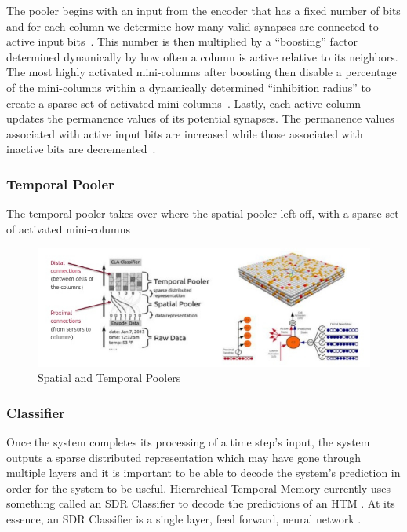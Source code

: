 \documentclass[oneside,12pt,openany]{book}
\begin{document}
	
	The pooler begins with an input from the encoder that has a fixed number of bits and for each column we determine how many valid synapses are connected to active input bits~\cite{Whitepaper}. This number is then multiplied by a ``boosting'' factor determined dynamically by how often a column is active relative to its neighbors. The most highly activated mini-columns after boosting then disable a percentage of the mini-columns within a dynamically determined ``inhibition radius'' to create a sparse set of activated mini-columns~\cite{Whitepaper}. Lastly, each active column updates the permanence values of its potential synapses. The permanence values associated with active input bits are increased while those associated with inactive bits are decremented~\cite{Whitepaper}.

	
	\subsubsection{Temporal Pooler}

	The temporal pooler takes over where the spatial pooler left off, with a sparse set of activated mini-columns

	\begin{figure}[!ht]
		\centering
		\includegraphics[width=\linewidth]{images/Poolers.jpg}
		\caption{Spatial and Temporal Poolers}
		\label{fig:Poolers}
	\end{figure}

	\subsubsection{Classifier}
	
	Once the system completes its processing of a time step's input, the system outputs a sparse distributed representation which may have gone through multiple layers and it is important to be able to decode the system's prediction in order for the system to be useful. Hierarchical Temporal Memory currently uses something called an SDR Classifier to decode the predictions of an HTM \cite{Dillon}. At its essence, an SDR Classifier is a single layer, feed forward, neural network \cite{Dillon}.
	
\end{document}
